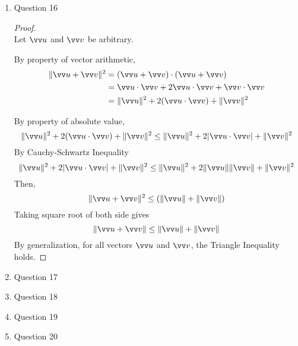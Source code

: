 \documentclass[11pt]{article}
\newcommand{\norm}[1]{\lVert #1 \rVert}
\begin{document}
\begin{enumerate}
\begin{enumerate}
\begin{proof}
            $P(t)$ will always be non-negative. Then, $P(t)=0$ has one or no solution.
            
            This implies that the discriminant $\Delta \leq 0$.
            
            By definition of the discriminant
            \begin{align*}
                \Delta = (-2(A \cdot B))^2 -4 \norm{B}^2 \norm{A}^2 &\leq 0 \\
                4(A\cdot B)^2 &\leq 4 \norm{A}^2\norm{B}^2 \\
                \sqrt{(A\cdot B)^2} & \leq \sqrt{\norm{A}^2\norm{B}^2}
            \end{align*}
            We can take out the square root. Hence, $|A\cdot B| \leq \norm{A}\norm{B}$.
            
            By generalization, for all vectors, the Cauchy-Schwartz Inequality holds.
        \end{proof}
    \end{enumerate}
    
    \item Question 16
    \hfill
    \begin{proof}
        \hfill \\
        Let $\vv u$ and $\vv v$ be arbitrary.
        
        By property of vector arithmetic,
        \begin{align*}
            \norm{\vv u + \vv v}^2 &= (\vv u + \vv v)\cdot (\vv u + \vv v) \\
            &= \vv u \cdot \vv v + 2\vv u \cdot \vv v + \vv v \cdot \vv v \\
            &= \norm{\vv u}^2 + 2(\vv u \cdot \vv v) + \norm{\vv v}^2
        \end{align*}

        By property of absolute value,
        $$
        \norm{\vv u}^2 + 2(\vv u \cdot \vv v) + \norm{\vv v}^2 \leq \norm{\vv u}^2 + 2 |\vv u \cdot \vv v| + \norm{\vv v}^2
        $$
        By Cauchy-Schwartz Inequality
        $$
        \norm{\vv u}^2 + 2 |\vv u \cdot \vv v| + \norm{\vv v}^2 \leq \norm{\vv u}^2 + 2 \norm{\vv u}\norm{\vv v} + \norm{\vv v}^2
        $$
        Then,
        $$
        \norm{\vv u + \vv v}^2 \leq (\norm{\vv u}+\norm{\vv v})
        $$
        Taking square root of both side gives
        $$
        \norm{\vv u + \vv v} \leq \norm{\vv u} + \norm{\vv v}
        $$
        By generalization, for all vectors $\vv u$ and $\vv v$, the Triangle Inequality holds.
    \end{proof}
    
    \item Question 17
    
    \item Question 18
    
    \item Question 19
    
    \item Question 20
\end{enumerate}
\end{document}
